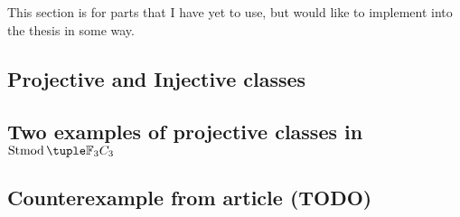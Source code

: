 
This section is for parts that I have yet to use, but would like to implement into the thesis in some way.

\subsection{Projective and Injective classes}


\subsection{Two examples of projective classes in \texorpdfstring{\( \Stmod{\Fb_3 C_3} \)}{Stmod(F\_3C\_3)}}


\subsection{Counterexample from article (TODO)}
